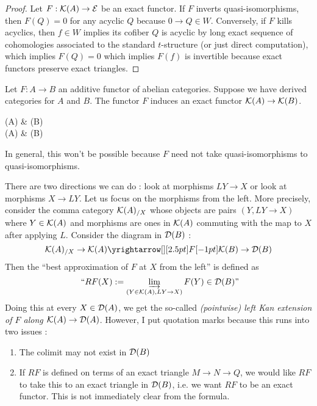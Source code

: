 \documentclass{article}
\begin{document}
\begin{proof}
  Let $F : \mathcal{K}(A) \to \mathcal{E}$ be an exact functor.
  If $F$ inverts quasi-isomorphisms,
  then $F(Q) = 0$ for any acyclic $Q$ because $0 \to Q \in W$.
  Conversely, if $F$ kills acyclics,
  then $f \in W$ implies its cofiber $Q$ is acyclic by long exact
  sequence of cohomologies associated to the standard $t$-structure 
  (or just direct computation),
  which implies $F(Q) = 0$ which implies $F(f)$ is invertible
  because exact functors preserve exact triangles.
\end{proof}
Let $F : A \to B$ an additive functor of abelian categories.
Suppose we have derived categories for $A$ and $B$.
The functor $F$ induces an exact functor $\mathcal{K}(A) \to \mathcal{K}(B)$.
\begin{center}
\end{center}
\begin{cd}
  {(A)} & {(B)} \\
	{(A)} & {(B)}
	\arrow["F", from=1-1, to=1-2]
	\arrow[from=1-1, to=2-1]
	\arrow[from=1-2, to=2-2]
	\arrow["{?}", dashed, from=2-1, to=2-2]
\end{cd}
In general, this won't be possible because
$F$ need not take quasi-isomorphisms to quasi-isomorphisms.
\begin{center}
\end{center}
There are two directions we can do : look at morphisms $LY \to X$
or look at morphisms $X \to LY$.
Let us focus on the morphisms from the left.
More precisely, consider the comma category $\mathcal{K}(A)_{/ X}$
whose objects are pairs $(Y , L Y \to X)$ where $Y \in \mathcal{K}(A)$
and morphisms are ones in $\mathcal{K}(A)$ commuting with
the map to $X$ after applying $L$.
Consider the diagram in $\mathcal{D}(B)$ : 
\[
  \cK(A)_{/X} \to \cK(A) \map{F}{} \cK(B) \to \cD(B)
\]
Then the ``best approximation of $F$ at $X$ from the left'' is defined as
\[
  \text{ ``$RF(X) := \varinjlim_{(Y \in \mathcal{K}(A) , LY \to X)} F(Y) \in \mathcal{D}(B)$''}
\]
Doing this at every $X \in \mathcal{D}(A)$, 
we get the so-called \emph{(pointwise) 
  left Kan extension of $F$ along $\mathcal{K}(A) \to \mathcal{D}(A)$}.\cite[
    \href{https://kerodon.net/tag/0300}{Tag 0300}
    ]{kerodon}
However, I put quotation marks because this runs into two issues : 
\begin{enumerate}
  \item The colimit may not exist in $\mathcal{D}(B)$
  \item If $RF$ is defined
  on terms of an exact triangle $M \to N \to Q$,
  we would like $RF$ to take this to an exact triangle in $\mathcal{D}(B)$,
  i.e. we want $RF$ to be an exact functor.
  This is not immediately clear from the formula.
\end{enumerate}
\end{document}
